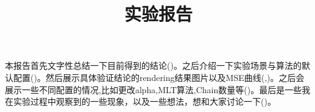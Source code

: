 \documentclass{article}
\date{}
\title{实验报告}
\begin{document}
\maketitle
\indent 本报告首先文字性总结一下目前得到的结论()。之后介绍一下实验场景与算法的默认配置()。然后展示具体验证结论的rendering结果图片以及MSE曲线(,)。之后会展示一些不同配置的情况,比如更改alpha,MLT算法,Chain数量等()。最后是一些我在实验过程中观察到的一些现象，以及一些想法，想和大家讨论一下()。




\clearpage

\clearpage

\end{document}
